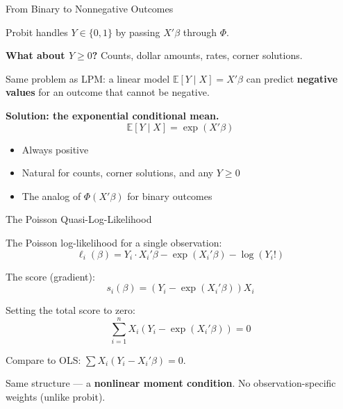 \documentclass[aspectratio=169, handout, t]{beamer}
\numberwithin{equation}{section}
\begin{document}
\begin{frame}{From Binary to Nonnegative Outcomes}

Probit handles $Y \in \{0,1\}$ by passing $X'\beta$ through $\Phi$.

\pause

\textbf{What about $Y \geq 0$?} Counts, dollar amounts, rates, corner solutions.

\pause

\bigskip

Same problem as LPM: a linear model $\mathbb{E}[Y \mid X] = X'\beta$ can predict \textbf{negative values} for an outcome that cannot be negative.

\pause

\bigskip

\textbf{Solution: the exponential conditional mean.}
\[
\mathbb{E}[Y \mid X] = \exp(X'\beta)
\]

\begin{itemize}
    \item Always positive
    \item Natural for counts, corner solutions, and any $Y \geq 0$
    \item The analog of $\Phi(X'\beta)$ for binary outcomes
\end{itemize}

\end{frame}


\begin{frame}{The Poisson Quasi-Log-Likelihood}

The Poisson log-likelihood for a single observation:
\[
\ell_i(\beta) = Y_i \cdot X_i'\beta - \exp(X_i'\beta) - \log(Y_i!)
\]

\pause

The score (gradient):
\[
s_i(\beta) = \left(Y_i - \exp(X_i'\beta)\right) X_i
\]

\pause

Setting the total score to zero:
\[
\boxed{\sum_{i=1}^n X_i\left(Y_i - \exp(X_i'\beta)\right) = 0}
\]

\pause

\bigskip

Compare to OLS: $\sum X_i(Y_i - X_i'\beta) = 0$.

\medskip

Same structure --- a \textbf{nonlinear moment condition}. No observation-specific weights (unlike probit).

\end{frame}
\end{document}
